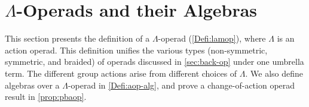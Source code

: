 

\section{\texorpdfstring{$\Lambda$}{L}-Operads and their Algebras}\label{sec:forward-op}

This section presents the definition of a $\Lambda$-operad (\cref{Defi:lamop}), where $\Lambda$ is an action operad.
This definition unifies the various types (non-symmetric, symmetric, and braided) of operads discussed in \cref{sec:back-op} under one umbrella term.
The different group actions arise from different choices of $\Lambda$.
We also define algebras over a $\Lambda$-operad in \cref{Defi:aop-alg}, and prove a change-of-action operad result in \cref{prop:pbaop}.

